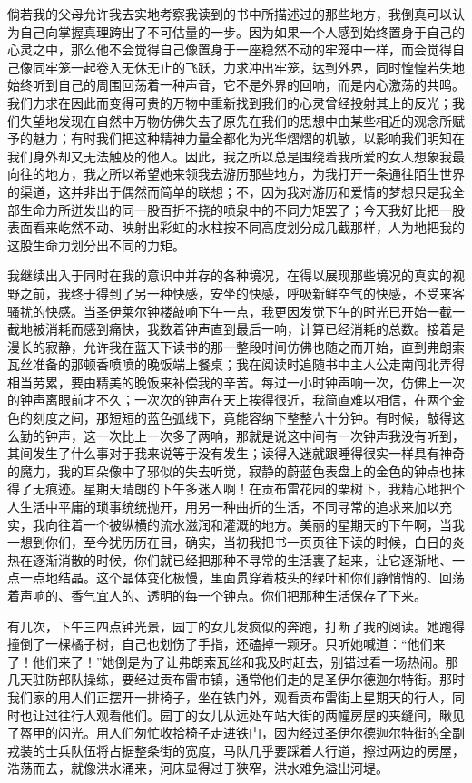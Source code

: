 \par 倘若我的父母允许我去实地考察我读到的书中所描述过的那些地方，我倒真可以认为自己向掌握真理跨出了不可估量的一步。因为如果一个人感到始终置身于自己的心灵之中，那么他不会觉得自己像置身于一座稳然不动的牢笼中一样，而会觉得自己像同牢笼一起卷入无休无止的飞跃，力求冲出牢笼，达到外界，同时惶惶若失地始终听到自己的周围回荡着一种声音，它不是外界的回响，而是内心激荡的共鸣。我们力求在因此而变得可贵的万物中重新找到我们的心灵曾经投射其上的反光；我们失望地发现在自然中万物仿佛失去了原先在我们的思想中由某些相近的观念所赋予的魅力；有时我们把这种精神力量全都化为光华熠熠的机敏，以影响我们明知在我们身外却又无法触及的他人。因此，我之所以总是围绕着我所爱的女人想象我最向往的地方，我之所以希望她来领我去游历那些地方，为我打开一条通往陌生世界的渠道，这并非出于偶然而简单的联想；不，因为我对游历和爱情的梦想只是我全部生命力所迸发出的同一股百折不挠的喷泉中的不同力矩罢了；今天我好比把一股表面看来屹然不动、映射出彩虹的水柱按不同高度划分成几截那样，人为地把我的这股生命力划分出不同的力矩。
\par 我继续出入于同时在我的意识中并存的各种境况，在得以展现那些境况的真实的视野之前，我终于得到了另一种快感，安坐的快感，呼吸新鲜空气的快感，不受来客骚扰的快感。当圣伊莱尔钟楼敲响下午一点，我更因发觉下午的时光已开始一截一截地被消耗而感到痛快，我数着钟声直到最后一响，计算已经消耗的总数。接着是漫长的寂静，允许我在蓝天下读书的那一整段时间仿佛也随之而开始，直到弗朗索瓦丝准备的那顿香喷喷的晚饭端上餐桌；我在阅读时追随书中主人公走南闯北弄得相当劳累，要由精美的晚饭来补偿我的辛苦。每过一小时钟声响一次，仿佛上一次的钟声离眼前才不久；一次次的钟声在天上挨得很近，我简直难以相信，在两个金色的刻度之间，那短短的蓝色弧线下，竟能容纳下整整六十分钟。有时候，敲得这么勤的钟声，这一次比上一次多了两响，那就是说这中间有一次钟声我没有听到，其间发生了什么事对于我来说等于没有发生；读得入迷就跟睡得很实一样具有神奇的魔力，我的耳朵像中了邪似的失去听觉，寂静的蔚蓝色表盘上的金色的钟点也抹得了无痕迹。星期天晴朗的下午多迷人啊！在贡布雷花园的栗树下，我精心地把个人生活中平庸的琐事统统抛开，用另一种曲折的生活，不同寻常的追求来加以充实，我向往着一个被纵横的流水滋润和灌溉的地方。美丽的星期天的下午啊，当我一想到你们，至今犹历历在目，确实，当初我把书一页页往下读的时候，白日的炎热在逐渐消散的时候，你们就已经把那种不寻常的生活裹了起来，让它逐渐地、一点一点地结晶。这个晶体变化极慢，里面贯穿着枝头的绿叶和你们静悄悄的、回荡着声响的、香气宜人的、透明的每一个钟点。你们把那种生活保存了下来。
\par 有几次，下午三四点钟光景，园丁的女儿发疯似的奔跑，打断了我的阅读。她跑得撞倒了一棵橘子树，自己也划伤了手指，还磕掉一颗牙。只听她喊道：“他们来了！他们来了！”她倒是为了让弗朗索瓦丝和我及时赶去，别错过看一场热闹。那几天驻防部队操练，要经过贡布雷市镇，通常他们走的是圣伊尔德迦尔特街。那时我们家的用人们正摆开一排椅子，坐在铁门外，观看贡布雷街上星期天的行人，同时也让过往行人观看他们。园丁的女儿从远处车站大街的两幢房屋的夹缝间，瞅见了盔甲的闪光。用人们匆忙收拾椅子走进铁门，因为经过圣伊尔德迦尔特街的全副戎装的士兵队伍将占据整条街的宽度，马队几乎要踩着人行道，擦过两边的房屋，浩荡而去，就像洪水涌来，河床显得过于狭窄，洪水难免溢出河堤。
